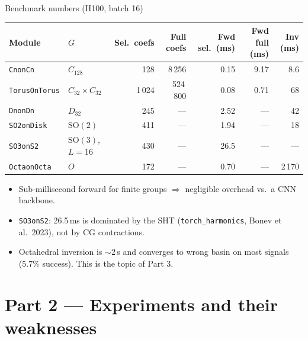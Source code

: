\documentclass[10pt,aspectratio=169]{beamer}
\newcommand{\SO}{\mathrm{SO}}
\begin{document}
\begin{frame}{Benchmark numbers (H100, batch 16)}
\centering\small
\begin{tabular}{llrrrrr}
\toprule
Module & $G$ & Sel.\ coefs & Full coefs & Fwd sel.\ (ms) & Fwd full (ms) & Inv (ms) \\
\midrule
\texttt{CnonCn} & $C_{128}$ & 128 & 8\,256 & 0.15 & 9.17 & 8.6 \\
\texttt{TorusOnTorus} & $C_{32}{\times}C_{32}$ & 1\,024 & 524\,800 & 0.08 & 0.71 & 68 \\
\texttt{DnonDn} & $D_{32}$ & 245 & --- & 2.52 & --- & 42 \\
\texttt{SO2onDisk} & $\SO(2)$ & 411 & --- & 1.94 & --- & 18 \\
\texttt{SO3onS2} & $\SO(3)$, $L{=}16$ & 430 & --- & 26.5 & --- & --- \\
\texttt{OctaonOcta} & $O$ & 172 & --- & 0.70 & --- & 2\,170 \\
\bottomrule
\end{tabular}
\vspace{0.6em}
\begin{itemize}
  \item Sub-millisecond forward for finite groups $\Rightarrow$ negligible
        overhead vs.\ a CNN backbone.
  \item \texttt{SO3onS2}: 26.5\,ms is dominated by the SHT
        (\texttt{torch\_harmonics}, Bonev et al.\ 2023), not by CG
        contractions.
  \item Octahedral inversion is $\sim$2\,s and \alert{converges to wrong basin}
        on most signals (5.7\% success). This is the topic of Part 3.
\end{itemize}
\end{frame}

\section{Part 2 --- Experiments and their weaknesses}
\end{document}
